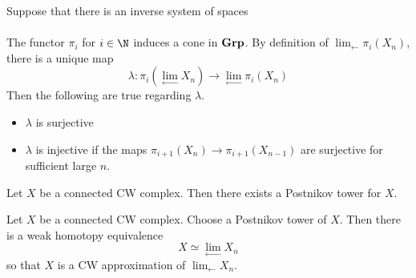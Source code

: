 \documentclass[a4paper]{article}
\begin{document}
\begin{thm}{}{} Suppose that there is an inverse system of spaces \\
\\
The functor $\pi_i$ for $i\in\N$ induces a cone in $\bold{Grp}$. By definition of $\lim_{\leftarrow}\pi_i(X_n)$, there is a unique map $$\lambda:\pi_i\left(\lim_{\leftarrow}X_n\right)\to\lim_{\leftarrow}\pi_i(X_n)$$ Then the following are true regarding $\lambda$. 
\begin{itemize}
\item $\lambda$ is surjective
\item $\lambda$ is injective if the maps $\pi_{i+1}(X_n)\to\pi_{i+1}(X_{n-1})$ are surjective for sufficient large $n$. 
\end{itemize}
\end{thm}

\begin{prp}{}{} Let $X$ be a connected CW complex. Then there exists a Postnikov tower for $X$. 
\end{prp}

\begin{prp}{}{} Let $X$ be a connected CW complex. Choose a Postnikov tower of $X$. Then there is a weak homotopy equivalence $$X\simeq\lim_{\leftarrow}X_n$$ so that $X$ is a CW approximation of $\lim_{\leftarrow}X_n$. 
\end{prp}
\end{document}
